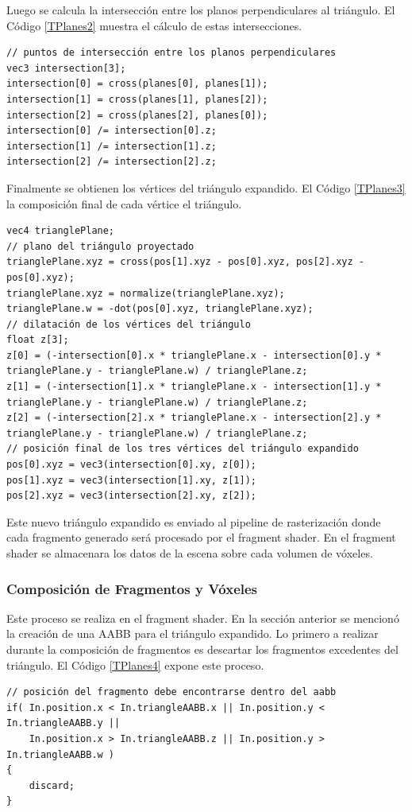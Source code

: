 Luego se calcula la intersección entre los planos perpendiculares al triángulo. El Código \ref{TPlanes2} muestra el cálculo de estas intersecciones.
\\
\begin{lstlisting}[caption={Intersección entre planos perpendiculares al triángulo proyectado.}, label=TPlanes2]
// puntos de intersección entre los planos perpendiculares
vec3 intersection[3];
intersection[0] = cross(planes[0], planes[1]);
intersection[1] = cross(planes[1], planes[2]);
intersection[2] = cross(planes[2], planes[0]);
intersection[0] /= intersection[0].z;
intersection[1] /= intersection[1].z;
intersection[2] /= intersection[2].z;
\end{lstlisting}

Finalmente se obtienen los vértices del triángulo expandido. El Código \ref{TPlanes3} la composición final de cada vértice el triángulo.
\\
\begin{lstlisting}[caption={Vértices del triángulo expandido.}, label=TPlanes3]
vec4 trianglePlane;
// plano del triángulo proyectado
trianglePlane.xyz = cross(pos[1].xyz - pos[0].xyz, pos[2].xyz - pos[0].xyz);
trianglePlane.xyz = normalize(trianglePlane.xyz);
trianglePlane.w = -dot(pos[0].xyz, trianglePlane.xyz);
// dilatación de los vértices del triángulo
float z[3];
z[0] = (-intersection[0].x * trianglePlane.x - intersection[0].y * trianglePlane.y - trianglePlane.w) / trianglePlane.z;
z[1] = (-intersection[1].x * trianglePlane.x - intersection[1].y * trianglePlane.y - trianglePlane.w) / trianglePlane.z;
z[2] = (-intersection[2].x * trianglePlane.x - intersection[2].y * trianglePlane.y - trianglePlane.w) / trianglePlane.z;
// posición final de los tres vértices del triángulo expandido
pos[0].xyz = vec3(intersection[0].xy, z[0]);
pos[1].xyz = vec3(intersection[1].xy, z[1]);
pos[2].xyz = vec3(intersection[2].xy, z[2]);
\end{lstlisting}

Este nuevo triángulo expandido es enviado al pipeline de rasterización donde cada fragmento generado será procesado por el fragment shader. En el fragment shader se almacenara los datos de la escena sobre cada volumen de vóxeles.

\subsubsection{Composición de Fragmentos y Vóxeles}

Este proceso se realiza en el fragment shader. En la sección anterior se mencionó la creación de una \ac{AABB} para el triángulo expandido. Lo primero a realizar durante la composición de fragmentos es descartar los fragmentos excedentes del triángulo. El Código \ref{TPlanes4} expone este proceso.
\\
\begin{lstlisting}[caption={Descarte de fragmentos excedentes en el fragment shader.}, label=TPlanes4]
// posición del fragmento debe encontrarse dentro del aabb
if( In.position.x < In.triangleAABB.x || In.position.y < In.triangleAABB.y || 
	In.position.x > In.triangleAABB.z || In.position.y > In.triangleAABB.w )
{
	discard;
}
\end{lstlisting}

